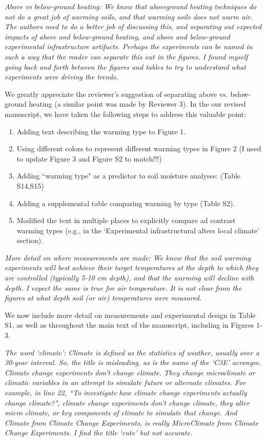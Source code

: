 \documentclass[11pt,a4paper]{letter}
\begin{document}
\par \emph{Above vs below-ground heating:  We know that aboveground heating techniques do not do a great job of warming soils, and that warming soils does not warm air. The authors need to do a better job of discussing this, and separating out expected impacts of above and below-ground heating, and above and below-ground experimental infrastructure artifacts.  Perhaps the experiments can be named in such a way that the reader can separate this out in the figures. I found myself going back and forth between the figures and tables to try to understand what experiments were driving the trends.} 
\par 
We greatly appreciate the reviewer's suggestion of separating above vs. below-ground heating (a similar point was made by Reviewer 3). In the our revised manuscript, we have taken the following steps to address this valuable point:
\begin{enumerate}
\item Adding text describing the warming type to Figure 1.
\item Using different colors  to represent different warming types in Figure 2 (I need to update Figure 3 and Figure S2 to match!!!)
\item Adding ``warming type" as a predictor to soil moisture analyses: (Table S14,S15)
\item Adding a supplemental table comparing warming by type (Table S2).
\item Modified the text in multiple places to explicitly compare ad contrast warming types (e.g., in the `Experimental infrastructural alters local climate' section). 
\end{enumerate}

\par \emph{More detail on where measurements are made:  We know that the soil warming experiments will best achieve their target temperatures at the depth to which they are controlled (typically 5-10 cm depth), and that the warming will decline with depth.  I expect the same is true for air temperature. It is not clear from the figures at what depth soil (or air) temperatures were measured.}
\par We now include more detail on measurements and experimental design in Table S1, as well as throughout the main text of the manuscript, including in Figures 1-3.

\par \emph{The word `climate': Climate is defined as the statistics of weather, usually over a 30-year interval. So, the title is misleading, as is the name of the `C3E' acronym.  Climate change experiments don't change climate.  They change microclimate or climatic variables in an attempt to simulate future or alternate climates.  For example, in line 22, ``To investigate how climate change experiments actually change climate?", climate change experiments don't change climate, they alter micro climate, or key components of climate to simulate that change.  And Climate from Climate Change Experiments, is really MicroClimate from Climate Change Experiments. I find the title `cute' but not accurate.}
\end{document}

